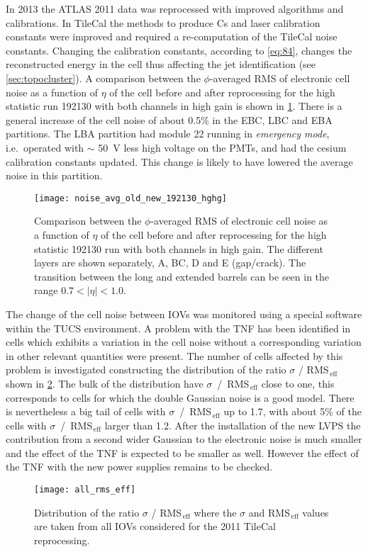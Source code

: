 In 2013 the ATLAS 2011 data was reprocessed with improved algorithms and
calibrations. In TileCal the methods to produce Cs and laser calibration
constants were improved and required a re-computation of the TileCal noise
constants. Changing the calibration constants, according to \cref{eq:84},
changes the reconstructed energy in the cell thus affecting the jet
identification (see \cref{sec:topocluster}). A comparison between the
$\phi$-averaged RMS of electronic cell noise as a function of $\eta$ of the
cell before and after reprocessing for the high statistic run 192130 with both
channels in high gain is shown in \cref{fig:noise_avg_old_new_hghg}. There is a
general increase of the cell noise of about 0.5\% in the EBC, LBC and EBA
partitions. The LBA partition had module 22 running in \emph{emergency mode},
i.e.\ operated with $\sim$ 50~V less high voltage on the PMTs, and had the
cesium calibration constants updated. This change is likely to have lowered the
average noise in this partition.

\begin{figure}[!h]
  \centering
    \texttt{[image: noise\_avg\_old\_new\_192130\_hghg]}
    \caption{Comparison between the $\phi$-averaged RMS of electronic cell
      noise as a function of $\eta$ of the cell before and after reprocessing
      for the high statistic 192130 run with both channels in high gain. The
      different layers are shown separately, A, BC, D and E (gap/crack). The
      transition between the long and extended barrels can be seen in the range
      $0.7 < |\eta| < 1.0$.}
    \label{fig:noise_avg_old_new_hghg}
\end{figure}

The change of the cell noise between IOVs was monitored using a special software
within the TUCS environment. A problem with the TNF has been identified in cells
which exhibits a variation in the cell noise without a corresponding variation
in other relevant quantities were present. The number of cells affected by this
problem is investigated constructing the distribution of the ratio $\sigma$ /
RMS$_\mathrm{\, eff}$ shown in \cref{fig:all_rms_eff}. The bulk of the
distribution have $\sigma$~/~RMS$_\mathrm{\, eff}$ close to one, this
corresponds to cells for which the double Gaussian noise is a good model. There
is nevertheless a big tail of cells with $\sigma$~/~RMS$_\mathrm{\, eff}$ up to
1.7, with about 5\% of the cells with $\sigma$~/~RMS$_\mathrm{\, eff}$ larger
than 1.2. After the installation of the new LVPS the contribution from a second
wider Gaussian to the electronic noise is much smaller and the effect of the TNF
is expected to be smaller as well. However the effect of the TNF with the new
power supplies remains to be checked.
\begin{figure}[!h]
  \centering
    \texttt{[image: all\_rms\_eff]}
    \caption{Distribution of the ratio $\sigma$ / RMS$_\mathrm{\, eff}$ where the
      $\sigma$ and RMS$_\mathrm{\, eff}$ values are taken from all IOVs
      considered for the 2011 TileCal reprocessing.}
    \label{fig:all_rms_eff}
\end{figure}

